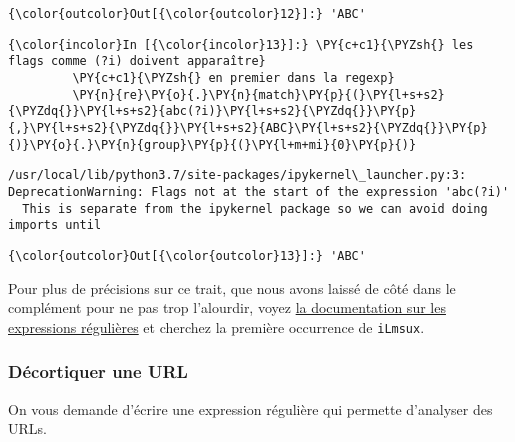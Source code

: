 \begin{Verbatim}[commandchars=\\\{\},frame=single,framerule=0.3mm,rulecolor=\color{cellframecolor}]
{\color{outcolor}Out[{\color{outcolor}12}]:} 'ABC'
\end{Verbatim}
            
    \begin{Verbatim}[commandchars=\\\{\},frame=single,framerule=0.3mm,rulecolor=\color{cellframecolor}]
{\color{incolor}In [{\color{incolor}13}]:} \PY{c+c1}{\PYZsh{} les flags comme (?i) doivent apparaître}
         \PY{c+c1}{\PYZsh{} en premier dans la regexp}
         \PY{n}{re}\PY{o}{.}\PY{n}{match}\PY{p}{(}\PY{l+s+s2}{\PYZdq{}}\PY{l+s+s2}{abc(?i)}\PY{l+s+s2}{\PYZdq{}}\PY{p}{,}\PY{l+s+s2}{\PYZdq{}}\PY{l+s+s2}{ABC}\PY{l+s+s2}{\PYZdq{}}\PY{p}{)}\PY{o}{.}\PY{n}{group}\PY{p}{(}\PY{l+m+mi}{0}\PY{p}{)}
\end{Verbatim}


    \begin{Verbatim}[commandchars=\\\{\},frame=single,framerule=0.3mm,rulecolor=\color{cellframecolor}]
/usr/local/lib/python3.7/site-packages/ipykernel\_launcher.py:3: DeprecationWarning: Flags not at the start of the expression 'abc(?i)'
  This is separate from the ipykernel package so we can avoid doing imports until
\end{Verbatim}

\begin{Verbatim}[commandchars=\\\{\},frame=single,framerule=0.3mm,rulecolor=\color{cellframecolor}]
{\color{outcolor}Out[{\color{outcolor}13}]:} 'ABC'
\end{Verbatim}
            
    Pour plus de précisions sur ce trait, que nous avons laissé de côté dans
le complément pour ne pas trop l'alourdir, voyez
\href{https://docs.python.org/3/library/re.html\#regular-expression-syntax}{la
documentation sur les expressions régulières} et cherchez la première
occurrence de \texttt{iLmsux}.

    \hypertarget{duxe9cortiquer-une-url}{%
\subsubsection{Décortiquer une URL}\label{duxe9cortiquer-une-url}}

    On vous demande d'écrire une expression régulière qui permette
d'analyser des URLs.

